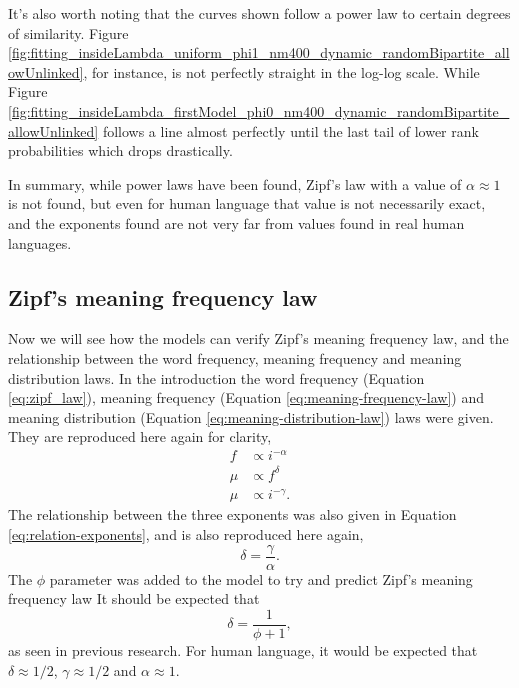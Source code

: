 It's also worth noting that the curves shown follow a power law to certain degrees of similarity.
Figure \ref{fig:fitting_insideLambda_uniform_phi1_nm400_dynamic_randomBipartite_allowUnlinked}, for instance, is not perfectly straight in the log-log scale.
While Figure \ref{fig:fitting_insideLambda_firstModel_phi0_nm400_dynamic_randomBipartite_allowUnlinked} follows a line almost perfectly until the last tail of lower rank probabilities which drops drastically.

In summary, while power laws have been found, Zipf's law with a value of $\alpha \approx 1$ is not found, but even for human language that value is not necessarily exact, and the exponents found are not very far from values found in real human languages.

\subsection{Zipf's meaning frequency law}
\label{sec:discussion_math_meaning-freq}

\begin{redenv}
Now we will see how the models can verify Zipf's meaning frequency law, and the relationship between the word frequency, meaning frequency and meaning distribution laws.
In the introduction the word frequency (Equation \eqref{eq:zipf_law}), meaning frequency (Equation \eqref{eq:meaning-frequency-law}) and meaning distribution (Equation \eqref{eq:meaning-distribution-law}) laws were given.
They are reproduced here again for clarity,
\begin{align*}
  f &\propto i^{-\alpha} \\
  \mu &\propto f^\delta \\
  \mu &\propto i^{-\gamma}.
\end{align*}
The relationship between the three exponents was also given in Equation \eqref{eq:relation-exponents}, and is also reproduced here again,
\begin{equation*}
  \delta = \frac{\gamma}{\alpha}.
\end{equation*}
The $\phi$ parameter was added to the model to try and predict Zipf's meaning frequency law
It should be expected that
\begin{equation}
  \label{eq:delta-from-phi}
  \delta = \frac{1}{\phi + 1},
\end{equation}
as seen in previous research. \cite{Ferrer2018a}
For human language, it would be expected that $\delta \approx 1/2$, $\gamma \approx 1/2$ and $\alpha \approx 1$.
\end{redenv}

